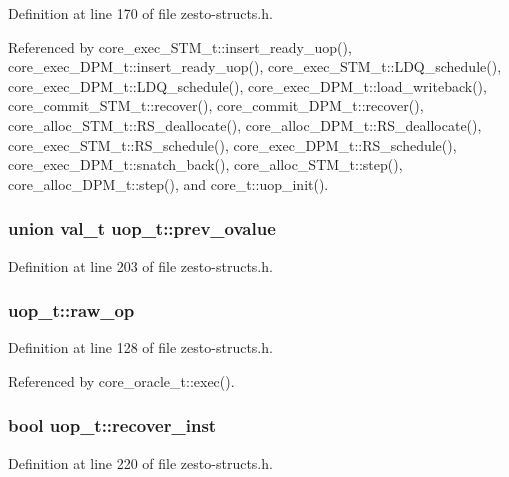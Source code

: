 Definition at line 170 of file zesto-structs.h.

Referenced by core\_\-exec\_\-STM\_\-t::insert\_\-ready\_\-uop(), core\_\-exec\_\-DPM\_\-t::insert\_\-ready\_\-uop(), core\_\-exec\_\-STM\_\-t::LDQ\_\-schedule(), core\_\-exec\_\-DPM\_\-t::LDQ\_\-schedule(), core\_\-exec\_\-DPM\_\-t::load\_\-writeback(), core\_\-commit\_\-STM\_\-t::recover(), core\_\-commit\_\-DPM\_\-t::recover(), core\_\-alloc\_\-STM\_\-t::RS\_\-deallocate(), core\_\-alloc\_\-DPM\_\-t::RS\_\-deallocate(), core\_\-exec\_\-STM\_\-t::RS\_\-schedule(), core\_\-exec\_\-DPM\_\-t::RS\_\-schedule(), core\_\-exec\_\-DPM\_\-t::snatch\_\-back(), core\_\-alloc\_\-STM\_\-t::step(), core\_\-alloc\_\-DPM\_\-t::step(), and core\_\-t::uop\_\-init().
\subsubsection[{prev\_\-ovalue}]{\setlength{\rightskip}{0pt plus 5cm}union {\bf val\_\-t} {\bf uop\_\-t::prev\_\-ovalue}\hspace{0.3cm}{\tt  [write]}}\label{structuop__t_bdf0d60c0e1c2ef1448d7fd8aff45819}




Definition at line 203 of file zesto-structs.h.
\subsubsection[{raw\_\-op}]{ {\bf uop\_\-t::raw\_\-op}}\label{structuop__t_16ed66cfd17998b95d7dc19e42336a55}




Definition at line 128 of file zesto-structs.h.

Referenced by core\_\-oracle\_\-t::exec().
\subsubsection[{recover\_\-inst}]{\setlength{\rightskip}{0pt plus 5cm}bool {\bf uop\_\-t::recover\_\-inst}}\label{structuop__t_7c9ed137c8fc7cfdcd22b0d45edd2926}




Definition at line 220 of file zesto-structs.h.

